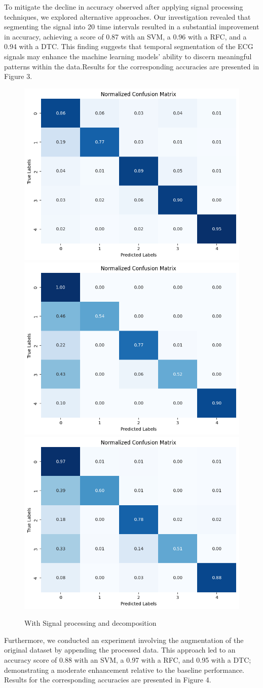 \documentclass[runningheads]{llncs}
\begin{document}
To mitigate the decline in accuracy observed after applying signal processing techniques, we explored alternative approaches. Our investigation revealed that segmenting the signal into 20 time intervals resulted in a substantial improvement in accuracy, achieving a score of 0.87 with an SVM, a 0.96 with a RFC, and a 0.94 with a DTC. This finding suggests that temporal segmentation of the ECG signals may enhance the machine learning models' ability to discern meaningful patterns within the data.Results for the corresponding accuracies are presented in Figure 3.
\begin{figure}
    \centering
    \includegraphics[width=0.4\linewidth]{figs/svc_proc2.png}
    \includegraphics[width=0.4\linewidth]{figs/random_for_proc2.png}
    \includegraphics[width=0.4\linewidth]{figs/d_tree_proc2.png}
    \caption{With Signal processing and decomposition}
    \label{fig:data_segmented}
\end{figure}

Furthermore, we conducted an experiment involving the augmentation of the original dataset by appending the processed data. This approach led to an accuracy score of 0.88 with an SVM, a 0.97 with a RFC, and 0.95 with a DTC; demonstrating a moderate enhancement relative to the baseline performance. Results for the corresponding accuracies are presented in Figure 4.
\end{document}
